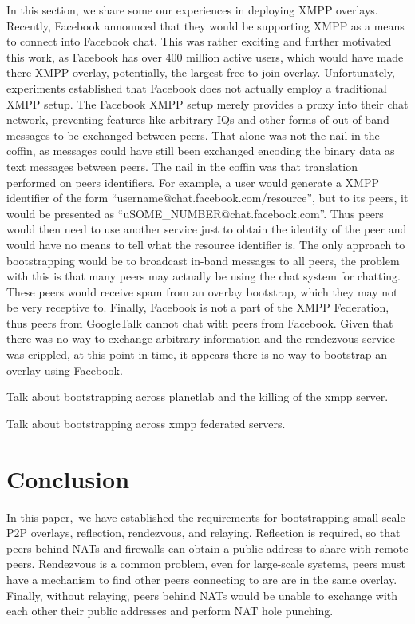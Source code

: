 \documentclass[conference]{IEEEtran}
\begin{document}
In this section, we share some our experiences in deploying XMPP overlays.
Recently, Facebook announced that they would be supporting XMPP as a means to
connect into Facebook chat.  This was rather exciting and further motivated
this work, as Facebook has over 400 million active users, which would have made
there XMPP overlay, potentially, the largest free-to-join overlay.
Unfortunately, experiments established that Facebook does not actually employ a
traditional XMPP setup.  The Facebook XMPP setup merely provides a proxy into
their chat network, preventing features like arbitrary IQs and other forms of
out-of-band messages to be exchanged between peers.  That alone was not the
nail in the coffin, as messages could have still been exchanged encoding the
binary data as text messages between peers.  The nail in the coffin was that
translation performed on peers identifiers.  For example, a user would generate
a XMPP identifier of the form ``username@chat.facebook.com/resource'', but to
its peers, it would be presented as ``uSOME\_NUMBER@chat.facebook.com''.  Thus
peers would then need to use another service just to obtain the identity of the
peer and would have no means to tell what the resource identifier is.  The only
approach to bootstrapping would be to broadcast in-band messages to all peers,
the problem with this is that many peers may actually be using the chat system
for chatting.  These peers would receive spam from an overlay bootstrap, which
they may not be very receptive to.  Finally, Facebook is not a part of the XMPP
Federation, thus peers from GoogleTalk cannot chat with peers from Facebook.
Given that there was no way to exchange arbitrary information and the
rendezvous service was crippled, at this point in time, it appears there is no
way to bootstrap an overlay using Facebook.

Talk about bootstrapping across planetlab and the killing of the xmpp server.

Talk about bootstrapping across xmpp federated servers.

\section{Conclusion}
\label{conclusions}

In this paper, we have established the requirements for bootstrapping small-scale
P2P overlays, reflection, rendezvous, and relaying.  Reflection is required, so
that peers behind NATs and firewalls can obtain a public address to share with
remote peers.  Rendezvous is a common problem, even for large-scale systems,
peers must have a mechanism to find other peers connecting to are are in the
same overlay.  Finally, without relaying, peers behind NATs would be unable to
exchange with each other their public addresses and perform NAT hole punching.
\end{document}
